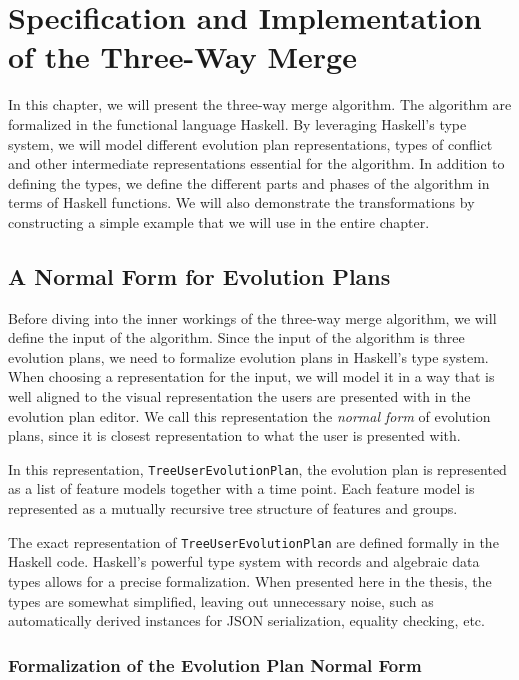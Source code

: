 \documentclass[a4paper,english]{ifimaster}
\begin{document}
\chapter{Specification and Implementation of the Three-Way Merge}%
\label{cha:specification_and_implementation_of_the_three_way_merge_algorithm}

In this chapter, we will present the three-way merge algorithm. The algorithm are formalized in the functional language Haskell. By leveraging Haskell's type system, we will model different evolution plan representations, types of conflict and other intermediate representations essential for the algorithm. In addition to defining the types, we define the different parts and phases of the algorithm in terms of Haskell functions. We will also demonstrate the transformations by constructing a simple example that we will use in the entire chapter.

\section{A Normal Form for Evolution Plans}%
\label{sec:defining_a_normal_form_for_evolution_plans}

Before diving into the inner workings of the three-way merge algorithm, we will define the input of the algorithm. Since the input of the algorithm is three evolution plans, we need to formalize evolution plans in Haskell's type system. When choosing a representation for the input, we will model it in a way that is well aligned to the visual representation the users are presented with in the evolution plan editor. We call this representation the \textit{normal form} of evolution plans, since it is closest representation to what the user is presented with.

In this representation, \texttt{TreeUserEvolutionPlan}, the evolution plan is represented as a list of feature models together with a time point. Each feature model is represented as a mutually recursive tree structure of features and groups. 

The exact representation of \texttt{TreeUserEvolutionPlan} are defined formally in the Haskell code. Haskell's powerful type system with records and algebraic data types allows for a precise formalization. When presented here in the thesis, the types are somewhat simplified, leaving out unnecessary noise, such as automatically derived instances for JSON serialization, equality checking, etc.

\subsection{Formalization of the Evolution Plan Normal Form}%
\label{sub:formalization_of_the_evolution_plan_normal_form}
\end{document}
